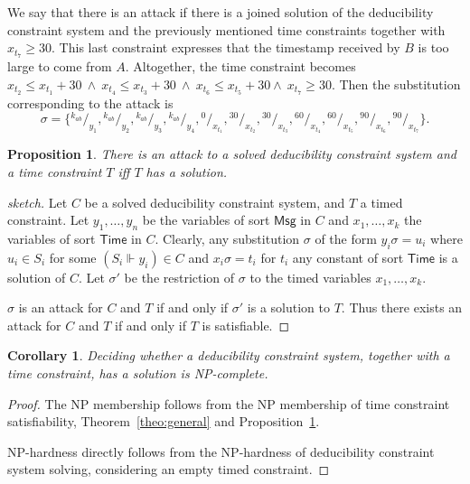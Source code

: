 \documentclass[acmtocl,acmnow]{acmtrans2m}
\newtheorem{corollary}[theorem]{Corollary}
\newtheorem{proposition}[theorem]{Proposition}
\newcommand{\comment}[1]{}
\newcommand{\set}[1]{\lbrace{#1}\rbrace}
\newcommand{\subst}[2]{{}^{#2}\!/_{\!#1}}
\newcommand{\term}{\mathsf{Msg}}
\newcommand{\Time}{\mathsf{Time}}
\newcommand{\dedsys}[1]{deducibility constraint system}
\begin{document}
\begin{example}
We say that there is an attack if there is a joined solution of the
\dedsys{} and  the previously mentioned time
constraints together with $x_{t_7}\geq 30$. This last constraint expresses that the 
timestamp received by $B$ is too
large to come from $A$.
Altogether, the time constraint becomes
$x_{t_2}\leq x_{t_1}+30\ \wedge\  x_{t_4}\leq x_{t_3}+30\ \wedge\  x_{t_6}\leq
x_{t_5}+30 \wedge\ x_{t_7}\geq 30.$
Then the substitution corresponding to the attack is
$$\sigma=\set{\subst{y_1}{k_{ab}},\subst{y_2}{k_{ab}},\subst{y_3}{k_{ab}},\subst{y_4}{k_{ab}},
\subst{x_{t_1}}{0},\subst{x_{t_2}}{30},\subst{x_{t_3}}{30},\subst{x_{t_4}}{60},
\subst{x_{t_5}}{60},\subst{x_{t_6}}{90},\subst{x_{t_7}}{90}}.$$
\comment{$$\sigma = \{y_1=y_2=y_3=y_4=k_{ab},\, x_{t_1}\!\!= 0,\, x_{t_2}\!\!=x_{t_3}\!\!=
30,\,  x_{t_4}\!\!=x_{t_5}\!\!= 60,\,
x_{t_6}\!\!=x_{t_7}\!\!=90\}.$$}
\end{example}



\begin{proposition}\label{prop:timed}
There is an attack to a solved \dedsys{} and a time constraint $T$ iff
$T$ has a solution. 
\end{proposition}
\begin{proof}[sketch]
Let $C$ be a solved \dedsys{},  and $T$ a timed constraint. Let
$y_1,\ldots,y_n$ be the variables of sort $\term$ in $C$ and $x_1,\ldots,x_k$ the variables of sort $\Time$
in $C$. Clearly, any substitution $\sigma$ of the form $y_i\sigma=u_i$ where $u_i\in S_i$ for some
$(S_i\Vdash y_i)\in C$ and $x_i\sigma=t_i$ for $t_i$ any constant of sort $\Time$ is a solution of $C$. Let $\sigma'$ be the restriction of $\sigma$ to the timed variables
$x_1,\ldots,x_k$.

 $\sigma$ is an attack for $C$ and $T$ if and only if $\sigma'$ is a solution to $T$. 
Thus there
exists an attack for $C$ and  $T$ if and only if $T$ is satisfiable. 
\end{proof}

\begin{corollary}
Deciding whether a \dedsys{}, together with a time constraint, has a solution
is NP-complete. 
\end{corollary}

\begin{proof}
The NP membership follows from the NP membership of time constraint satisfiability,  
Theorem~\ref{theo:general} and
Proposition~\ref{prop:timed}.

NP-hardness directly follows from the NP-hardness of \dedsys{} solving, considering
an empty timed constraint.
\end{proof}
\end{document}

